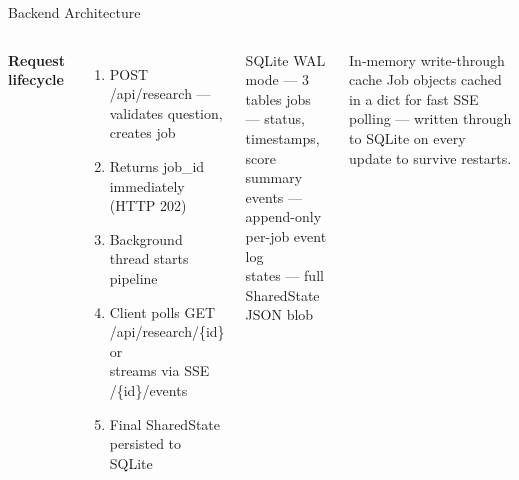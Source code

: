 \documentclass[aspectratio=169, 10pt]{beamer}
\newcommand{\code}[1]{{\ttfamily\small\color{code-red}#1}}
\begin{document}
\begin{frame}{Backend Architecture}
  \begin{columns}[T]
      \textbf{\color{aims-blue}Request lifecycle}
      \begin{enumerate}
        \item \code{POST /api/research} --- validates question, creates job
        \item Returns \code{job\_id} immediately (HTTP 202)
        \item Background thread starts pipeline
        \item Client polls \code{GET /api/research/\{id\}} or\\
              streams via SSE \code{/\{id\}/events}
        \item Final \code{SharedState} persisted to SQLite
      \end{enumerate}
      \begin{block}{SQLite WAL mode --- 3 tables}
        \scriptsize
        \code{jobs} --- status, timestamps, score summary\\[0.2em]
        \code{events} --- append-only per-job event log\\[0.2em]
        \code{states} --- full \code{SharedState} JSON blob
      \end{block}
      \vspace{0.4em}
      \begin{block}{In-memory write-through cache}
        \scriptsize
        Job objects cached in a dict for fast SSE polling ---
        written through to SQLite on every update to survive restarts.
      \end{block}
  \end{columns}
\end{frame}
\end{document}
